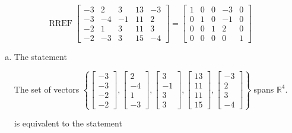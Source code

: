 \begin{exerciseAnswer} 


\[\operatorname{RREF} \left[\begin{array}{ccccc}
-3 & 2 & 3 & 13 & -3 \\
-3 & -4 & -1 & 11 & 2 \\
-2 & 1 & 3 & 11 & 3 \\
-2 & -3 & 3 & 15 & -4
\end{array}\right] = \left[\begin{array}{ccccc}
1 & 0 & 0 & -3 & 0 \\
0 & 1 & 0 & -1 & 0 \\
0 & 0 & 1 & 2 & 0 \\
0 & 0 & 0 & 0 & 1
\end{array}\right] \]


\begin{enumerate}[(a)]
\item The statement 
\begin{center}\begin{minipage}{0.8\textwidth}
 The set of vectors \( \left\{ \left[\begin{array}{c}
-3 \\
-3 \\
-2 \\
-2
\end{array}\right] , \left[\begin{array}{c}
2 \\
-4 \\
1 \\
-3
\end{array}\right] , \left[\begin{array}{c}
3 \\
-1 \\
3 \\
3
\end{array}\right] , \left[\begin{array}{c}
13 \\
11 \\
11 \\
15
\end{array}\right] , \left[\begin{array}{c}
-3 \\
2 \\
3 \\
-4
\end{array}\right] \right\} \) spans \(\mathbb{R}^4\). 
\end{minipage}\end{center}
     is equivalent to the statement 

\end{enumerate}
\end{exerciseAnswer}
